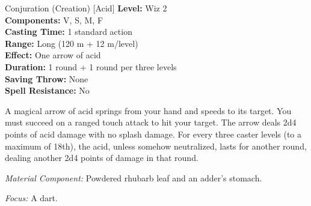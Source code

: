 {Conjuration (Creation) [Acid]}
{
	\textbf{Level:}
	Wiz 2\\
	\textbf{Components:}
	V, S, M, F\\
	\textbf{Casting Time:}
	1 standard action\\
	\textbf{Range:}
	Long (120 m + 12 m/level)\\
	\textbf{Effect:}
	One arrow of acid\\
	\textbf{Duration:}
	1 round + 1 round per three levels\\
	\textbf{Saving Throw:}
	None\\
	\textbf{Spell Resistance:}
	No\\
}
{
	A magical arrow of acid springs from your hand and speeds to its target. You must succeed on a ranged touch attack to hit your target. The arrow deals 2d4 points of acid damage with no splash damage. For every three caster levels (to a maximum of 18th), the acid, unless somehow neutralized, lasts for another round, dealing another 2d4 points of damage in that round.

	\textit{Material Component:}
	Powdered rhubarb leaf and an adder's stomach.

	\textit{Focus:}
	A dart.

}

